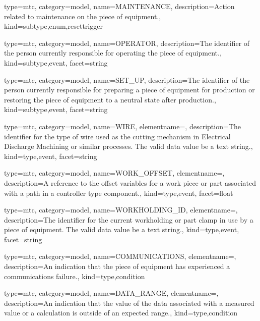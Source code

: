 {
  type=mtc,
  category=model,
  name={MAINTENANCE},
  description={Action related to maintenance on the piece of equipment.},
  kind={subtype,enum,resettrigger}
}


{
  type=mtc,
  category=model,
  name={OPERATOR},
  description={The identifier of the person currently responsible for operating the piece of equipment.},
  kind={subtype,event},
  facet={\gls{string}}
}


{
  type=mtc,
  category=model,
  name={SET\_UP},
  description={The identifier of the person currently responsible for preparing a piece of equipment for production or restoring the piece of equipment to a neutral state after production.},
  kind={subtype,event},
  facet={\gls{string}}
}


{
  type=mtc,
  category=model,
  name={WIRE},
  elementname=,
  description={The identifier for the type of wire used as the cutting mechanism in Electrical Discharge Machining or similar processes. \newline The \gls{valid data value} \must be a text string.},
  kind={type,event},
  facet={\gls{string}}
}


{
  type=mtc,
  category=model,
  name={WORK\_OFFSET},
  elementname=,
  description={A reference to the offset variables for a work piece or part associated with a \gls{path} in a \gls{controller} type component.},
  kind={type,event},
  facet={\gls{float}}
}


{
  type=mtc,
  category=model,
  name={WORKHOLDING\_ID},
  elementname=,
  description={The identifier for the current workholding or part clamp in use by a piece of equipment. \newline The \gls{valid data value} \must be a text string.},
  kind={type,event},
  facet={\gls{string}}
}



{
  type=mtc,
  category=model,
  name={COMMUNICATIONS},
  elementname=,
  description={An indication that the piece of equipment has experienced a communications failure.},
  kind={type,condition}
}


{
  type=mtc,
  category=model,
  name={DATA\_RANGE},
  elementname=,
  description={An indication that the value of the data associated with a measured value or a calculation is outside of an expected range.},
  kind={type,condition}
}



